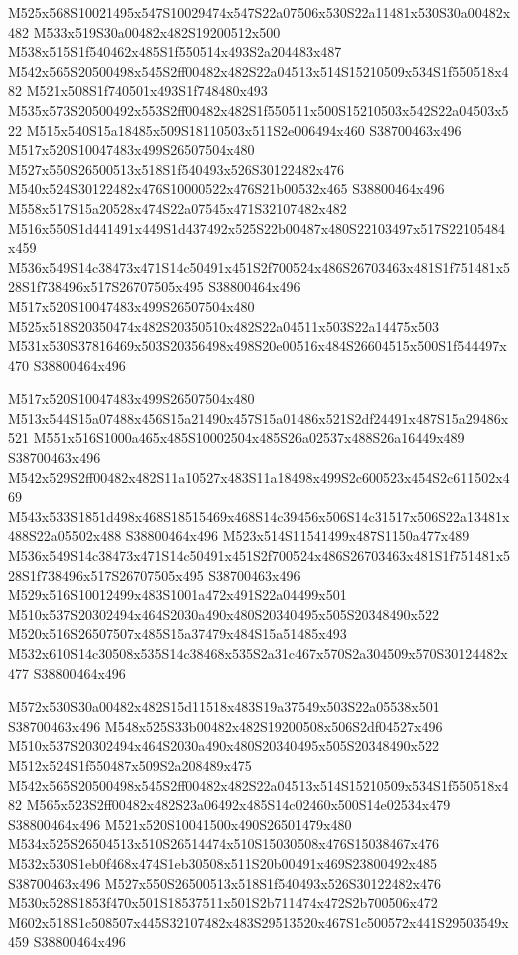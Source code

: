 \documentclass{article}
\begin{document}
\begin{multicols}{2}
M525x568S10021495x547S10029474x547S22a07506x530S22a11481x530S30a00482x482 M533x519S30a00482x482S19200512x500 M538x515S1f540462x485S1f550514x493S2a204483x487 M542x565S20500498x545S2ff00482x482S22a04513x514S15210509x534S1f550518x482 M521x508S1f740501x493S1f748480x493 M535x573S20500492x553S2ff00482x482S1f550511x500S15210503x542S22a04503x522 M515x540S15a18485x509S18110503x511S2e006494x460 S38700463x496 M517x520S10047483x499S26507504x480 M527x550S26500513x518S1f540493x526S30122482x476 M540x524S30122482x476S10000522x476S21b00532x465 S38800464x496 M558x517S15a20528x474S22a07545x471S32107482x482 M516x550S1d441491x449S1d437492x525S22b00487x480S22103497x517S22105484x459 M536x549S14c38473x471S14c50491x451S2f700524x486S26703463x481S1f751481x528S1f738496x517S26707505x495 S38800464x496 M517x520S10047483x499S26507504x480 M525x518S20350474x482S20350510x482S22a04511x503S22a14475x503 M531x530S37816469x503S20356498x498S20e00516x484S26604515x500S1f544497x470 S38800464x496

M517x520S10047483x499S26507504x480 M513x544S15a07488x456S15a21490x457S15a01486x521S2df24491x487S15a29486x521 M551x516S1000a465x485S10002504x485S26a02537x488S26a16449x489 S38700463x496 M542x529S2ff00482x482S11a10527x483S11a18498x499S2c600523x454S2c611502x469 M543x533S1851d498x468S18515469x468S14c39456x506S14c31517x506S22a13481x488S22a05502x488 S38800464x496 M523x514S11541499x487S1150a477x489 M536x549S14c38473x471S14c50491x451S2f700524x486S26703463x481S1f751481x528S1f738496x517S26707505x495 S38700463x496 M529x516S10012499x483S1001a472x491S22a04499x501 M510x537S20302494x464S2030a490x480S20340495x505S20348490x522 M520x516S26507507x485S15a37479x484S15a51485x493 M532x610S14c30508x535S14c38468x535S2a31c467x570S2a304509x570S30124482x477 S38800464x496

M572x530S30a00482x482S15d11518x483S19a37549x503S22a05538x501 S38700463x496 M548x525S33b00482x482S19200508x506S2df04527x496 M510x537S20302494x464S2030a490x480S20340495x505S20348490x522 M512x524S1f550487x509S2a208489x475 M542x565S20500498x545S2ff00482x482S22a04513x514S15210509x534S1f550518x482 M565x523S2ff00482x482S23a06492x485S14c02460x500S14e02534x479 S38800464x496 M521x520S10041500x490S26501479x480 M534x525S26504513x510S26514474x510S15030508x476S15038467x476 M532x530S1eb0f468x474S1eb30508x511S20b00491x469S23800492x485 S38700463x496 M527x550S26500513x518S1f540493x526S30122482x476 M530x528S1853f470x501S18537511x501S2b711474x472S2b700506x472 M602x518S1c508507x445S32107482x483S29513520x467S1c500572x441S29503549x459 S38800464x496


\end{multicols}
\end{document}
